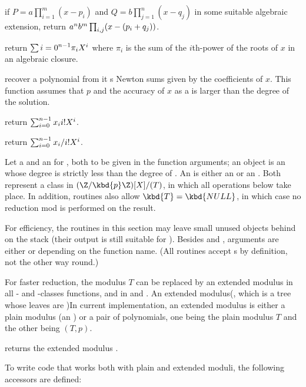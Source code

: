  if
$P=a\prod_{i=1}^m(x-p_i)$ and $Q=b\prod_{j=1}^n(x-q_j)$ in some suitable
algebraic extension, return $a^n\*b^m\prod_{i,j}(x-(p_i+q_j))$.

 return
$\sum{i=0}^{n-1} \pi_i\*X^i$ where $\pi_i$ is the sum of the $i$th-power
of the roots of $x$ in an algebraic closure.

 recover a polynomial from it
s Newton sums given by the coefficients of $x$.
This function assumes that $p$ and the accuracy of $x$ as a  is
larger than the degree of the solution.

 return
$\sum_{i=0}^{n-1} x_i\*i!\*X^i$.

 return
$\sum_{i=0}^{n-1} x_i/{i!}\*X^i$.

 Let  a  and  an
 for , both to be given in the function arguments; an 
object is an  whose degree is strictly less than the degree of
. An  is either an  or an . Both represent
a class in $(\Z/\kbd{p}\Z)[X] / (T)$, in which all operations below take
place. In addition,  routines also allow $\kbd{T} = \kbd{NULL}$, in
which case no reduction mod  is performed on the result.

For efficiency, the routines in this section may leave small unused objects
behind on the stack (their output is still suitable for ).
Besides  and , arguments are either  or 
depending on the function name. (All  routines accept s by
definition, not the other way round.)


For faster reduction, the modulus $T$ can be replaced by an extended modulus
in all - and -classes functions, and in  and
. An extended modulus(, which is a tree whose leaves are )In
current implementation, an extended modulus is either a plain modulus (an
) or a pair of polynomials, one being the plain modulus $T$ and the
other being $(T,p)$.

 returns the extended modulus .

To write code that works both with plain and extended moduli, the following
accessors are defined:

